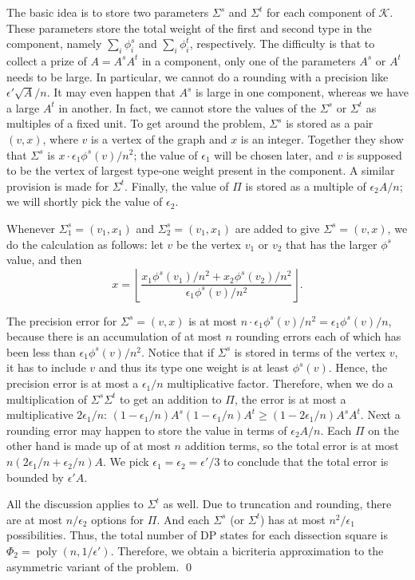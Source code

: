 \documentclass[extras,11pt]{article} \usepackage{fullpage}
\theoremstyle{mytheorem}
\newenvironment{proofof}[1]{\par\noindent{\bf #1.}\hspace{0.5em}}
    {\hfill\qed\vspace{1ex}}
\DeclareMathOperator{\poly}{poly}
\newcommand{\eps}{\epsilon}
\begin{document}
The basic idea is to store two parameters $\Sigma^s$ and $\Sigma^t$ for each component of $\mathcal{K}$.
These parameters store the total weight of the first and second type in the component, namely $\sum_i\phi^s_i$ and $\sum_i\phi^t_i$, respectively.
The difficulty is that to collect a prize of $A=A^sA^t$ in a component,
only one of the parameters $A^s$ or $A^t$ needs to be large.
In particular, we cannot do a rounding with a precision like $\eps'\sqrt A/n$.
It may even happen that  $A^s$ is large in one component, whereas we have a large $A^t$ in another.
In fact, we cannot store the values of the $\Sigma^s$  or $\Sigma^t$ as multiples of a fixed unit.
To get around the problem, $\Sigma^s$ is stored as a pair $(v,x)$, where $v$ is  a vertex of the graph
and $x$ is an integer.
Together they show that $\Sigma^s$ is $x\cdot\eps_1\phi^s(v)/n^2$;
the value of $\eps_1$ will be chosen later, and $v$ is supposed to be the vertex of largest
type-one weight present in the component.
A similar provision is made for $\Sigma^t$.
Finally, the value of $\Pi$ is stored as a multiple of $\eps_2 A/n$;
we will shortly pick the value of $\eps_2$.


Whenever $\Sigma^s_1=(v_1,x_1)$ and $\Sigma^s_2=(v_1,x_1)$ are added to give
$\Sigma^s=(v,x)$,  we do the calculation as follows:
let $v$ be the vertex  $v_1$ or $v_2$ that has the larger $\phi^s$ value,
and then 
$$x=\left\lfloor \frac{x_1\phi^s(v_1)/n^2 +  x_2\phi^s(v_2)/n^2}{\eps_1\phi^s(v)/n^2} \right\rfloor.$$



\begin{proofof}{\proofname\ of Theorem~\ref{thm:asym-smpcsf}}
The precision error for $\Sigma^s=(v,x)$ is at most
$n\cdot\eps_1\phi^s(v)/n^2=\eps_1\phi^s(v)/n$, because there is an accumulation of at most $n$
rounding errors each of which has been less than $\eps_1\phi^s(v)/n^2$.
Notice that if $\Sigma^s$ is stored in terms of the vertex $v$, it has to include $v$ and
thus its type one weight is at least $\phi^s(v)$.  Hence, the precision error is at most a
$\eps_1/n$ multiplicative factor.
Therefore, when we do a multiplication of $\Sigma^s\Sigma^t$ to get an addition to $\Pi$,
the error is at most a multiplicative $2\eps_1/n$:
$(1-\eps_1/n)A^s(1-\eps_1/n)A^t\geq(1-2\eps_1/n)A^sA^t$.
Next a rounding error may happen to store the value in terms of $\eps_2 A/n$.
Each $\Pi$ on the other hand is made up of at most $n$ addition terms,
so the total error is at most $n(2\eps_1/n+\eps_2/n)A$.
We pick $\eps_1=\eps_2=\eps'/3$ to conclude that the total error is bounded by
$\eps' A$.

All the discussion applies to $\Sigma^t$ as well.
Due to truncation and rounding, there are at most $n/\eps_2$ options for $\Pi$.
And each $\Sigma^s$ (or $\Sigma^t$) has at most $n^2/\eps_1$ possibilities.
Thus, the total number of DP states for each dissection square is $\Phi_2=\poly(n,1/\eps')$.
Therefore, we obtain a bicriteria approximation to the asymmetric variant of the problem.
\end{proofof}
\end{document}
